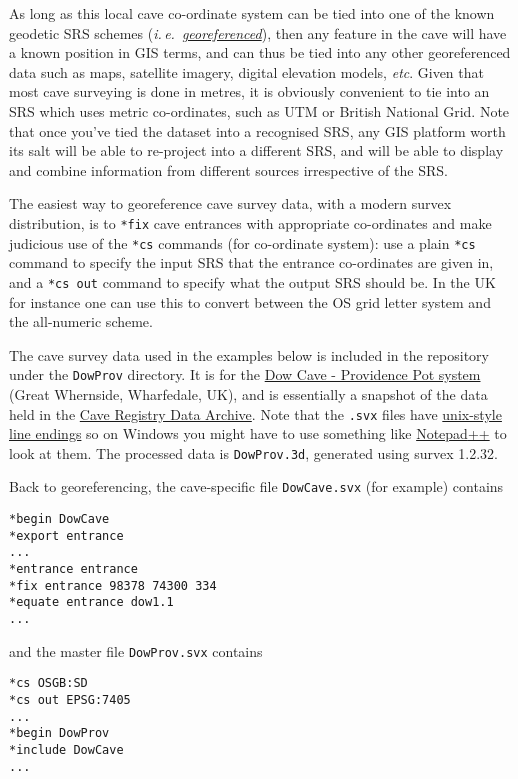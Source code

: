 \documentclass[]{article}
\newcommand{\latin}[1]{\emph{#1}}
\newcommand{\ie}{\latin{i.\,e.}}
\newcommand{\etc}{\latin{etc}}
\begin{document}
As long as this local cave co-ordinate system can be tied into one of
the known geodetic SRS schemes (\ie\
\href{https://en.wikipedia.org/wiki/Georeferencing}{\emph{georeferenced}}),
then any feature in the cave will have a known position in GIS terms,
and can thus be tied into any other georeferenced data such as maps,
satellite imagery, digital elevation models, \etc. Given that most cave
surveying is done in metres, it is obviously convenient to tie into an
SRS which uses metric co-ordinates, such as UTM or British National
Grid. Note that once you've tied the dataset into a recognised SRS, any
GIS platform worth its salt will be able to re-project into a different
SRS, and will be able to display and combine information from different
sources irrespective of the SRS.

The easiest way to georeference cave survey data, with a modern survex
distribution, is to \verb}*fix} cave entrances with appropriate
co-ordinates and make judicious use of the \verb}*cs} commands (for
co-ordinate system): use a plain \verb}*cs} command to specify the
input SRS that the entrance co-ordinates are given in, and a
\verb}*cs out} command to specify what the output SRS should be. In
the UK for instance one can use this to convert between the OS grid
letter system and the all-numeric scheme.

The cave survey data used in the examples below is included in the
repository under the \verb}DowProv} directory. It is for the
\href{http://www.mudinmyhair.co.uk/}{Dow Cave - Providence Pot system}
(Great Whernside, Wharfedale, UK), and is essentially a snapshot of the
data held in the \href{http://cave-registry.org.uk/}{Cave Registry Data
Archive}. Note that the \verb}.svx} files have
\href{https://en.wikipedia.org/wiki/Newline}{unix-style line endings} so
on Windows you might have to use something like
\href{https://notepad-plus-plus.org/}{Notepad{\small++}} to look at them. The
processed data is \verb}DowProv.3d}, generated using survex 1.2.32.

Back to georeferencing, the cave-specific file \verb}DowCave.svx} (for
example) contains

\begin{verbatim}
*begin DowCave
*export entrance
...
*entrance entrance
*fix entrance 98378 74300 334
*equate entrance dow1.1
...
\end{verbatim}

and the master file \verb}DowProv.svx} contains

\begin{verbatim}
*cs OSGB:SD
*cs out EPSG:7405
...
*begin DowProv
*include DowCave
...
\end{verbatim}
\end{document}

